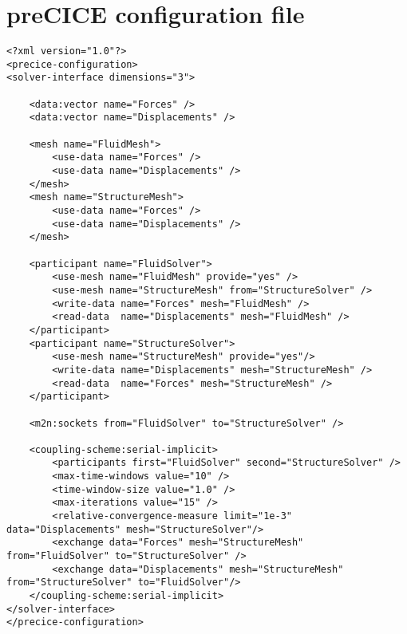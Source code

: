 \chapter{preCICE configuration file}
\label{app:pc-config-file}

\lstset{language=XML}
\begin{lstlisting}[caption=preCICE configuration file example, label=precice-config]
<?xml version="1.0"?>
<precice-configuration>
<solver-interface dimensions="3">
	
	<data:vector name="Forces" />
	<data:vector name="Displacements" />
	
	<mesh name="FluidMesh">
		<use-data name="Forces" />
		<use-data name="Displacements" />
	</mesh>
	<mesh name="StructureMesh">
		<use-data name="Forces" />
		<use-data name="Displacements" />
	</mesh>
	
	<participant name="FluidSolver">
		<use-mesh name="FluidMesh" provide="yes" />
		<use-mesh name="StructureMesh" from="StructureSolver" />
		<write-data name="Forces" mesh="FluidMesh" />
		<read-data  name="Displacements" mesh="FluidMesh" />
	</participant>
	<participant name="StructureSolver">
		<use-mesh name="StructureMesh" provide="yes"/>
		<write-data name="Displacements" mesh="StructureMesh" />
		<read-data  name="Forces" mesh="StructureMesh" />
	</participant>
	
	<m2n:sockets from="FluidSolver" to="StructureSolver" />

	<coupling-scheme:serial-implicit>
		<participants first="FluidSolver" second="StructureSolver" />
		<max-time-windows value="10" />
		<time-window-size value="1.0" />
		<max-iterations value="15" />
		<relative-convergence-measure limit="1e-3" data="Displacements" mesh="StructureSolver"/>
		<exchange data="Forces" mesh="StructureMesh" from="FluidSolver" to="StructureSolver" />
		<exchange data="Displacements" mesh="StructureMesh" from="StructureSolver" to="FluidSolver"/>
	</coupling-scheme:serial-implicit>
</solver-interface>
</precice-configuration>
\end{lstlisting}




